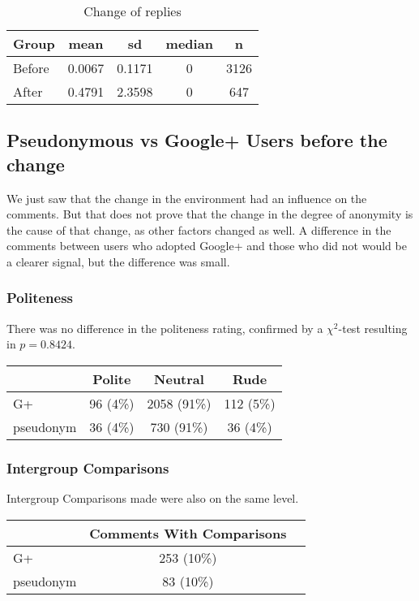 \documentclass{chi-ext2}
\begin{document}
\begin{table}
\caption{Change of replies}
\centering
\begin{tabular}{| l | c | c | c | c |}
\hline
\hline
Group & mean & sd & median & n \\
\hline
Before & 0.0067 & 0.1171 & 0 & 3126 \\
After & 0.4791 & 2.3598 & 0 & 647 \\
\hline
\end{tabular}
\label{table:repliesChange}
\end{table}



\subsection{Pseudonymous vs Google+ Users before the change}

We just saw that the change in the environment had an influence on the comments. But that does not prove that the change in the degree of anonymity is the cause of that change, as other factors changed as well. A difference in the comments between users who adopted Google+ and those who did not would be a clearer signal, but the difference was small.

\subsubsection{Politeness}
There was no difference in the politeness rating, confirmed by a \(\chi^2\)-test resulting in \(p = 0.8424\).

\begin{center}
\begin{tabular}{| l | c | c | c | }
    \hline
     & Polite & Neutral & Rude \\
    \hline
    G+ & 96 (4\%) & 2058 (91\%) & 112 (5\%) \\
    pseudonym & 36 (4\%) & 730 (91\%) & 36 (4\%) \\
 \hline
\end{tabular}
\end{center}

\subsubsection{Intergroup Comparisons}
Intergroup Comparisons made were also on the same level.

\begin{center}
\begin{tabular}{| l | c | c | }
    \hline
     & Comments With Comparisons \\
    \hline
    G+ & 253 (10\%) \\
    pseudonym & 83 (10\%) \\
 \hline
\end{tabular}
\end{center}
\end{document}
